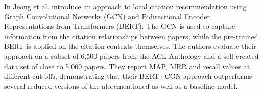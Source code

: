In \cite{Jeong2019} Jeong et al. introduce an approach to local citation recommendation using Graph Convolutional Networks (GCN) and Bidirectional Encoder Representations from Transformers (BERT). The GCN is used to capture information from the citation relationships between papers, while the pre-trained BERT is applied on the citation contexts themselves. The authors evaluate their approach on a subset of 6,500 papers from the ACL Anthology and a self-created data set of close to 5,000 papers. They report MAP, MRR and recall values at different cut-offs, demonstrating that their BERT+CGN approach outperforms several reduced versions of the aforementioned as well as a baseline model.
